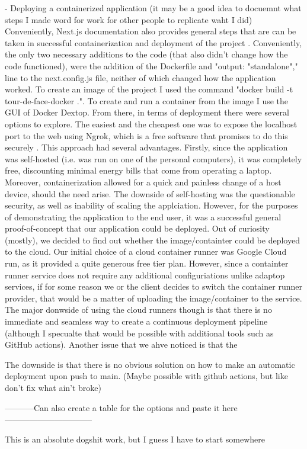 - Deploying a containerized application (it may be a good idea to docuemnt what steps I made word for work for other people to replicate waht I did)
Conveniently, Next.js documentation also provides general steps that are can be taken in successful containerization and deployment of the project \cite{vercelMainDeploymentMainPage}\cite{next.js/examples/with-docker}. Conveniently, the only two necessary additions to the code (that also didn't change how the code functioned), were the addition of the Dockerfile \cite{next.js/examples/with-docker/Dockerfile} and "output: "standalone"," line to the next.config.js file, neither of which changed how the application worked. To create an image of the project I used the command "docker build -t tour-de-face-docker .". To create and run a container from the image I use the GUI of Docker Dextop. From there, in terms of deployment there were several options to explore. The easiest and the cheapest one was to expose the localhost port to the web using Ngrok, which is a free software that promises to do this securely \cite{ngrokMain} \cite{ngrokMainDocs}. This approach had several advantages. Firstly, since the application was self-hosted (i.e. was run on one of the personal computers), it was completely free, discounting minimal energy bills that come from operating a laptop. Moreover, containerization allowed for a quick and painless change of a host device, should the need arise. The downside of self-hosting was the questionable security, as well as inability of scaling the applciation. However, for the purposes of demonstrating the application to the end user, it was a successful general proof-of-concept that our application could be deployed. Out of curiosity (mostly), we decided to find out whether the image/containter could be deployed to the cloud. Our initial choice of a cloud container runner was Google Cloud run, as it provided a quite generous free tier plan. However, since a containter runner service does not require any additional configuriations unlike adaptop services, if for some reason we or the client decides to switch the container runner provider, that would be a matter of uploading the image/container to the service. The major donwside of using the cloud runners though is that there is no immediate and seamless way to create a continuous deployment pipeline (although I specualte that would be possible with additional tools such as GitHub actions). Another issue that we ahve noticed is that the 

The downside is that there is no obvious solution on how to make an automatic deployment upon push to main. (Maybe possible with github actions, but like don't fix what ain't broke)

-----------Can also create a table for the options and paste it here--------------------------------

This is an absolute dogshit work, but I guess I have to start somewhere